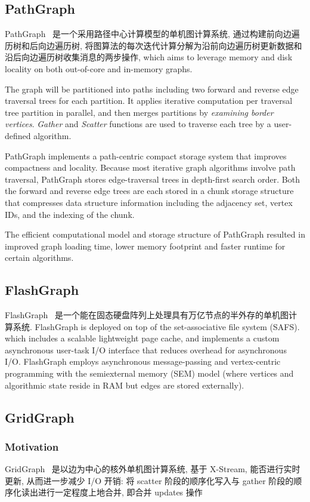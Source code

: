 \documentclass[UTF8,12pt,a4paper]{article}
\begin{document}
\subsection{PathGraph}
PathGraph~\cite{DBLP:conf/sc/YuanZXJLL14}
是一个采用路径中心计算模型的单机图计算系统, 通过构建前向边遍历树和后向边遍历树,
将图算法的每次迭代计算分解为沿前向边遍历树更新数据和沿后向边遍历树收集消息的两步操作,
which aims to leverage memory and disk locality
on both out-of-core and in-memory graphs.

The graph will be partitioned into paths
including two forward and reverse edge traversal trees for each partition.
It applies iterative computation per traversal tree partition in parallel,
and then merges partitions by \textit{examining border vertices}.
\textit{Gather} and \textit{Scatter} functions
are used to traverse each tree by a user-defined algorithm.

PathGraph implements a path-centric compact storage system
that improves compactness and locality.
Because most iterative graph algorithms involve path traversal,
PathGraph stores edge-traversal trees in depth-first search order.
Both the forward and reverse edge trees are
each stored in a chunk storage structure that compresses data structure information
including the adjacency set, vertex IDs, and the indexing of the chunk.

The efficient computational model and storage structure of PathGraph
resulted in improved graph loading time, lower memory footprint
and faster runtime for certain algorithms.

\subsection{FlashGraph}
FlashGraph~\cite{DBLP:conf/fast/ZhengMBVPS15}
是一个能在固态硬盘阵列上处理具有万亿节点的半外存的单机图计算系统.
FlashGraph is deployed on top of the set-associative file system (SAFS).
which includes a scalable lightweight page cache,
and implements a custom asynchronous user-task I/O interface
that reduces overhead for asynchronous I/O.
FlashGraph employs asynchronous message-passing
and vertex-centric programming with the semiexternal memory (SEM) model
(where vertices and algorithmic state reside in RAM but edges are stored externally).

\subsection{GridGraph}
\subsubsection{Motivation}
GridGraph~\cite{DBLP:conf/usenix/ZhuHC15} 是以边为中心的核外单机图计算系统,
基于 X-Stream, 能否进行实时更新, 从而进一步减少 I/O 开销:
将 scatter 阶段的顺序化写入与 gather 阶段的顺序化读出进行一定程度上地合并,
即合并 updates 操作
\end{document}
